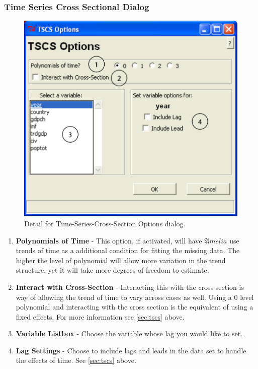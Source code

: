 \documentclass[12pt,titlepage]{article}
\begin{document}
\subsubsection{Time Series Cross Sectional Dialog}
\label{sec:tscsdiag}
\begin{figure}[ht]
  \centering \includegraphics[scale=.75]{tscs}
  \caption{Detail for Time-Series-Cross-Section Options dialog.}
\end{figure}
\begin{enumerate}
\item \textbf{Polynomials of Time} - This option, if activated, will
  have ${\mathfrak Amelia}$ use trends of time as a additional
  condition for fitting the missing data.  The higher the level of
  polynomial will allow more variation in the trend structure, yet it
  will take more degrees of freedom to estimate.
\item \textbf{Interact with Cross-Section} - Interacting this with the
  cross section is way of allowing the trend of time to vary across
  cases as well.  Using a 0 level polynomial and interacting with the
  cross section is the equivalent of using a fixed effects.  For more
  information see \ref{sec:tscs} above.
\item \textbf{Variable Listbox} - Choose the variable whose lag you
  would like to set.
\item \textbf{Lag Settings} - Choose to include lags and leads in the
  data set to handle the effects of time.  See \ref{sec:tscs} above.
\end{enumerate}
\end{document}
